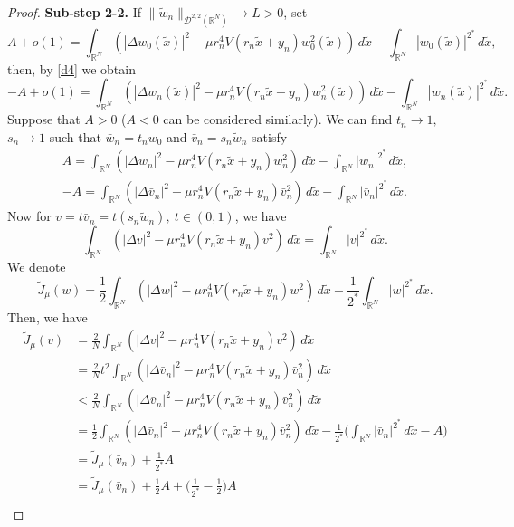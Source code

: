 \documentclass[10pt,a4paper]{amsart}
\numberwithin{equation}{section}
\begin{document}
\begin{proof}
\noindent\textbf{Sub-step 2-2.}
 If \(\|\tilde{w}_n\|_{ \mathcal{D}^{2,2}(\mathbb{R}^N)}\to L>0\), set
 \[
 A+o(1)=\int_{\mathbb{R}^N}\left( |\Delta w_0(\tilde{x})|^2
 -\mu r_n^4V(r_n\tilde{x}+y_n)w_0^2(\tilde{x})\right) \, d\tilde{x}-\int _{\mathbb{R}^N}|w_0(\tilde{x})|^{2^*}\,d\tilde{x},
 \]
 then, by \eqref{d4} we obtain
\[
 -A+o(1)=\int_{\mathbb{R}^N}\left( |\Delta w_n(\tilde{x})|^2-\mu r_n^4V(r_n\tilde{x}+y_n)w_n^2(\tilde{x})\right) \, d\tilde{x}-\int _{\mathbb{R}^N}|w_n(\tilde{x})|^{2^*}\,d\tilde{x}.
\]
Suppose that \(A>0\) ($A<0$ can be considered similarly). We can find 
\(t_n\to 1, \) \(s_n\to 1\) such that
\( \bar {w}_n=t_n w_0\) and \(\bar {v}_n=s_n \tilde{w}_n\)
satisfy
 \begin{gather}\label{e1}
 A=\int_{\mathbb{R}^N}\left(|\Delta \bar {w}_n|^2-\mu r_n^4V(r_n\tilde{x}+y_n)
 \bar {w}_n^2\right) \,d\tilde{x}-\int _{\mathbb{R}^N}| \bar {w}_n|^{2^*}\,d\tilde{x},\\
\label{e2}
 -A= \int_{\mathbb{R}^N}\left(|\Delta \bar {v}_n|^2
 -\mu r_n^4V(r_n\tilde{x}+y_n)\bar {v}_n^2\right)\,d\tilde{x} 
 -\int _{\mathbb{R}^N}| \bar {v}_n|^{2^*}\,d\tilde{x}.
 \end{gather}
Now for \(v=t\bar{v}_n=t(s_n\tilde{w}_n), \ t\in (0,1)\), we have
 \[
 \int_{\mathbb{R}^N}\left(|\Delta v|^2-\mu r_n^4V(r_n\tilde{x}+y_n)v^2\right)\,d\tilde{x}=\int _{\mathbb{R}^N}|v|^{2^*}\,d\tilde{x}.
 \]
We denote
\[
 \tilde{J}_\mu(w)=\frac{1}{2}\int_{\mathbb{R}^N}\left(|\Delta w|^2-\mu r_n^4V(r_n\tilde{x}+y_n)w^2\right)\,d\tilde{x}-\frac{1}{2^*}\int _{\mathbb{R}^N}|w|^{2^*}\,d\tilde{x}.
\]
Then, we have
 \begin{align*}
 \tilde{J}_\mu(v)
 &=\frac{2}{N}\int_{\mathbb{R}^N}\left(|\Delta v|^2
  -\mu r_n^4V(r_n\tilde{x}+y_n)v^2\right)\,d\tilde{x}\\
 &=\frac{2}{N}t^2\int_{\mathbb{R}^N}\left(|\Delta \bar {v}_n|^2
  -\mu r_n^4V(r_n\tilde{x}+y_n)\bar {v}_n^2\right)\,d\tilde{x}\\
 &<\frac{2}{N}\int_{\mathbb{R}^N}\left(|\Delta \bar {v}_n|^2
  -\mu r_n^4V(r_n\tilde{x}+y_n)\bar {v}_n^2\right)\,d\tilde{x}\\
 &=\frac{1}{2}\int_{\mathbb{R}^N}\left(|\Delta \bar {v}_n|^2
  -\mu r_n^4V(r_n\tilde{x}+y_n)\bar {v}_n^2\right)\,d\tilde{x}
  -\frac{1}{2^*}\Big(\int _{\mathbb{R}^N}| \bar {v}_n|^{2^*}\,d\tilde{x}-A\Big) \\
 &=\tilde{J}_\mu(\bar {v}_n)+\frac{1}{2^*}A\\
 &=\tilde{J}_\mu(\bar {v}_n)+\frac{1}{2}A
  +\Big( \frac{1}{2^*}-\frac{1}{2}\Big) A\\

\end{align*}
\end{proof}
\end{document}
